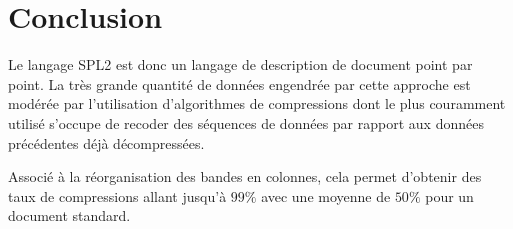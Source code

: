 \section{Conclusion}
Le langage SPL2 est donc un langage de description de document point par point.
La très grande quantité de données engendrée par cette approche est modérée
par l'utilisation d'algorithmes de compressions dont le plus couramment utilisé
s'occupe de recoder des séquences de données par rapport aux données
précédentes déjà décompressées.

Associé à la réorganisation des bandes en colonnes, cela permet d'obtenir des
taux de compressions allant jusqu'à $99\%$ avec une moyenne de $50\%$ pour un
document standard.
